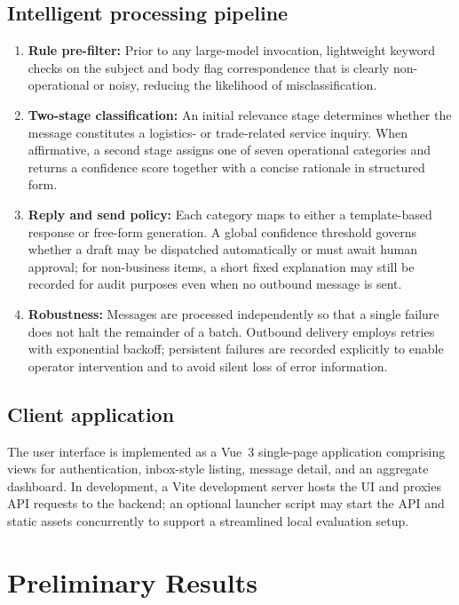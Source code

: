 \documentclass[12pt]{article}
\begin{document}
\subsection{Intelligent processing pipeline}
\begin{enumerate}
  \item \textbf{Rule pre-filter:} Prior to any large-model invocation, lightweight keyword checks on the subject and body flag correspondence that is clearly non-operational or noisy, reducing the likelihood of misclassification.
  \item \textbf{Two-stage classification:} An initial relevance stage determines whether the message constitutes a logistics- or trade-related service inquiry. When affirmative, a second stage assigns one of seven operational categories and returns a confidence score together with a concise rationale in structured form.
  \item \textbf{Reply and send policy:} Each category maps to either a template-based response or free-form generation. A global confidence threshold governs whether a draft may be dispatched automatically or must await human approval; for non-business items, a short fixed explanation may still be recorded for audit purposes even when no outbound message is sent.
  \item \textbf{Robustness:} Messages are processed independently so that a single failure does not halt the remainder of a batch. Outbound delivery employs retries with exponential backoff; persistent failures are recorded explicitly to enable operator intervention and to avoid silent loss of error information.
\end{enumerate}

\subsection{Client application}
The user interface is implemented as a Vue~3 single-page application comprising views for authentication, inbox-style listing, message detail, and an aggregate dashboard. In development, a Vite development server hosts the UI and proxies API requests to the backend; an optional launcher script may start the API and static assets concurrently to support a streamlined local evaluation setup.


\section{Preliminary Results}
\end{document}
